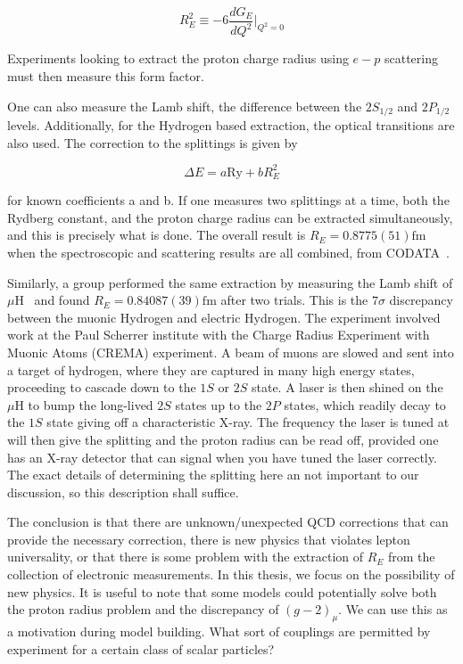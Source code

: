 \begin{equation}
    R_E^2 \equiv -6 \frac{d G_E}{d Q^2}\rvert_{Q^2=0}
\end{equation}

\noindent Experiments looking to extract the proton charge radius using $e-p$ scattering must then measure this form factor.

One can also measure the Lamb shift, the difference between the $2S_{1/2}$ and $2P_{1/2}$ levels.
Additionally, for the Hydrogen based extraction, the optical transitions are also used.
The correction to the splittings is given by

\begin{equation}
    \Delta E = a \textrm{Ry} + b R_E^2
\end{equation}

\noindent for known coefficients a and b. If one measures two splittings at a time, both the Rydberg constant, and the proton charge radius can be extracted simultaneously, and this is precisely what is done.
The overall result is $R_E = 0.8775(51)\textrm{fm}$ when the spectroscopic and scattering results are all combined, from CODATA~\cite{Mohr:2012tt}.

Similarly, a group performed the same extraction by measuring the Lamb shift of $\mu\textrm{H}$~\cite{Pohl:2010zza,Antognini:1900ns} and found $R_E = 0.84087(39)\textrm{fm}$ after two trials.
This is the $7\sigma$ discrepancy between the muonic Hydrogen and electric Hydrogen.
The experiment involved work at the Paul Scherrer institute with the Charge Radius Experiment with Muonic Atoms (CREMA) experiment.
A beam of muons are slowed and sent into a target of hydrogen, where they are captured in many high energy states, proceeding to cascade down to the $1S$ or $2S$ state.
A laser is then shined on the $\mu\textrm{H}$ to bump the long-lived $2S$ states up to the $2P$ states, which readily decay to the $1S$ state giving off a characteristic X-ray.
The frequency the laser is tuned at will then give the splitting and the proton radius can be read off, provided one has an X-ray detector that can signal when you have tuned the laser correctly.
The exact details of determining the splitting here an not important to our discussion, so this description shall suffice.

The conclusion is that there are unknown/unexpected QCD corrections that can provide the necessary correction, there is new physics that violates lepton universality, or that there is some problem with the extraction of $R_E$ from the collection of electronic measurements.
In this thesis, we focus on the possibility of new physics.
It is useful to note that some models could potentially solve both the proton radius problem and the discrepancy of $(g-2)_\mu$.
We can use this as a motivation during model building.
What sort of couplings are permitted by experiment for a certain class of scalar particles?
